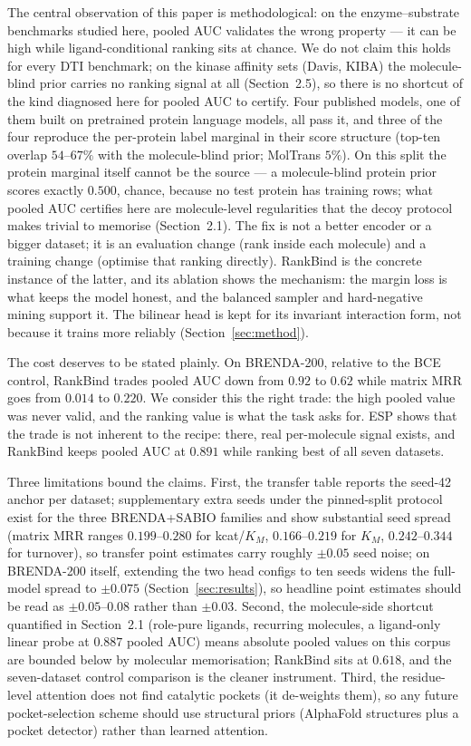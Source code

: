 \documentclass[11pt,a4paper]{article}
\newcommand{\method}{RankBind\xspace}
\newcommand{\mrr}{matrix MRR}
\begin{document}
The central observation of this paper is methodological: on the
enzyme--substrate benchmarks studied here, pooled AUC validates the wrong
property --- it can be high while ligand-conditional ranking sits at
chance. We do not claim this holds for every DTI benchmark; on the kinase
affinity sets (Davis, KIBA) the molecule-blind prior carries no ranking
signal at all (Section~2.5), so there is no shortcut of the kind diagnosed
here for pooled AUC to certify. Four published models,
one of them built on pretrained protein language models, all pass it, and
three of the four reproduce the per-protein label marginal in their score
structure (top-ten overlap $54$--$67\%$ with the molecule-blind prior;
MolTrans $5\%$). On this
split the protein marginal itself cannot be the source --- a molecule-blind
protein prior scores exactly $0.500$, chance, because no test protein has
training rows; what pooled AUC certifies here are molecule-level regularities
that the decoy protocol makes trivial to memorise (Section~2.1). The fix is
not a better encoder or a bigger
dataset; it is an evaluation change (rank inside each molecule) and a
training change (optimise that ranking directly). \method{} is the concrete
instance of the latter, and its ablation shows the mechanism: the margin
loss is what keeps the model honest, and the balanced sampler and
hard-negative mining support it. The bilinear head is kept for its
invariant interaction form, not because it trains more reliably
(Section~\ref{sec:method}).

The cost deserves to be stated plainly. On BRENDA-200, relative to the BCE
control, \method{} trades pooled AUC down from $0.92$ to $0.62$ while \mrr{}
goes from $0.014$ to $0.220$. We consider this the right trade: the high
pooled value was never valid, and the ranking value is what the task asks
for. ESP shows that the trade is not inherent to the recipe: there, real
per-molecule signal exists, and \method{} keeps pooled AUC at $0.891$ while
ranking best of all seven datasets.

Three limitations bound the claims. First, the transfer table reports the
seed-42 anchor per dataset; supplementary extra seeds under the pinned-split
protocol exist for the three BRENDA+SABIO families and show substantial
seed spread (matrix MRR ranges $0.199$--$0.280$ for kcat/$K_M$,
$0.166$--$0.219$ for $K_M$,
$0.242$--$0.344$ for turnover), so transfer point estimates carry roughly
$\pm 0.05$ seed noise; on BRENDA-200 itself, extending the two head configs
to ten seeds widens the full-model spread to $\pm 0.075$
(Section~\ref{sec:results}), so headline point estimates should be read as
$\pm 0.05$--$0.08$ rather than $\pm 0.03$. Second, the molecule-side
shortcut quantified in Section~2.1 (role-pure ligands, recurring
molecules, a ligand-only linear probe at $0.887$ pooled AUC) means
absolute pooled values on this corpus are bounded below by molecular
memorisation; \method{} sits at $0.618$, and the seven-dataset control
comparison is the cleaner instrument. Third, the residue-level
attention does not find catalytic pockets (it de-weights them), so any
future pocket-selection scheme should use structural priors (AlphaFold
structures plus a pocket detector) rather than learned attention.
\end{document}
